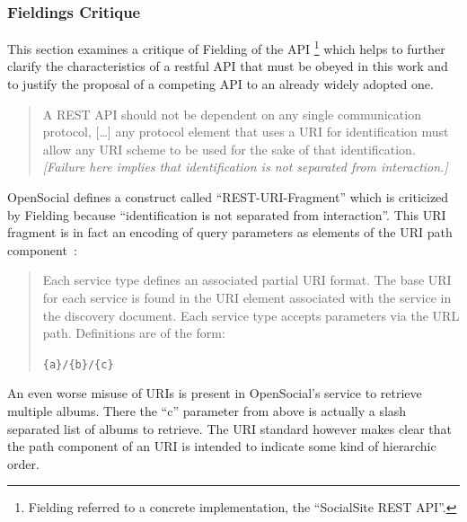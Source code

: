 \documentclass[11pt,a4paper,headsepline,twoside]{scrartcl}		%
\newcommand{\citeurl}[2]{\url{#1} (#2)}
\begin{document}
\subsubsection{Fieldings Critique}
\label{sec:fieldings-critique}

This section examines a critique of Fielding of the
API \cite{Fielding2008}\footnote{Fielding referred to a concrete implementation,
  the ``SocialSite REST API''.} which helps to further clarify the
characteristics of a restful API that must be obeyed in this work and to justify
the proposal of a competing API to an already widely adopted one.

\begin{quote}
  A REST API should not be dependent on any single communication protocol,
  [\ldots] any protocol element that uses a URI for identification must allow
  any URI scheme to be used for the sake of that identification.
  \textit{[Failure here implies that identification is not separated from
    interaction.]}
\end{quote}

OpenSocial defines a construct called ``REST-URI-Fragment'' which is criticized
by Fielding because ``identification is not separated from interaction''.  This
URI fragment is in fact an encoding of query parameters as elements of the URI
path component~\cite[Core API Server, sec 2.1.1.2.2,
REST-URI-Fragment]{OSSpec2.0.1}:

\begin{quote}
  Each service type defines an associated partial URI format. The base URI for
  each service is found in the URI element associated with the service in the
  discovery document. Each service type accepts parameters via the URL
  path. Definitions are of the form:
  
  \lstinline:{a}/{b}/{c}:
\end{quote}

An even worse misuse of URIs is present in OpenSocial's service to retrieve
multiple albums. There the ``c'' parameter from above is actually a slash
separated list of albums to retrieve. The URI standard however makes clear that
the path component of an URI is intended to indicate some kind of hierarchic
order\cite[sec 3.3]{RFC3986}.

\end{document}
